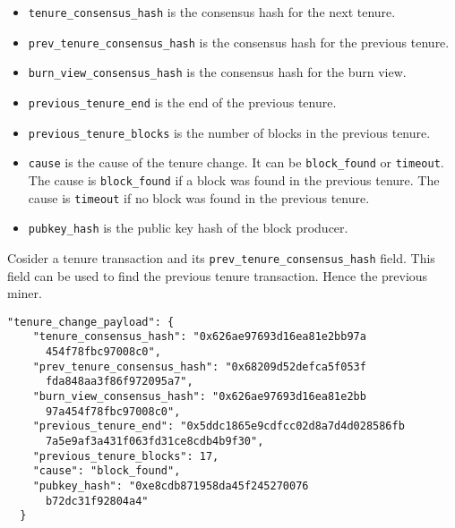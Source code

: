 \documentclass[12pt]{article}
\begin{document}
\begin{itemize}   

\item \lstinline|tenure_consensus_hash| is the consensus hash for the next tenure.

\item \lstinline|prev_tenure_consensus_hash| is the consensus hash for the previous tenure.

\item \lstinline|burn_view_consensus_hash| is the consensus hash for the burn view.

\item \lstinline|previous_tenure_end| is the end of the previous tenure.  

\item \lstinline|previous_tenure_blocks| is the number of blocks in the previous tenure.

\item \lstinline|cause| is the cause of the tenure change.  It can be \lstinline|block_found| or \lstinline|timeout|.
The cause is \lstinline|block_found| if a block was found in the previous tenure.
The cause is \lstinline|timeout| if no block was found in the previous tenure.

\item \lstinline|pubkey_hash| is the public key hash of the block producer.

\end{itemize}
%

Cosider a tenure transaction and its \lstinline|prev_tenure_consensus_hash| field.
This field can be used to find the previous tenure transaction. 
Hence the previous miner. 

%
%
\vspace{0.25in}
%
%

%
%
\begin{lstlisting}[label=JsonTenure,style=json, caption={Tenure part}]
  "tenure_change_payload": {
    "tenure_consensus_hash": "0x626ae97693d16ea81e2bb97a
      454f78fbc97008c0",
    "prev_tenure_consensus_hash": "0x68209d52defca5f053f
      fda848aa3f86f972095a7",
    "burn_view_consensus_hash": "0x626ae97693d16ea81e2bb
      97a454f78fbc97008c0",
    "previous_tenure_end": "0x5ddc1865e9cdfcc02d8a7d4d028586fb
      7a5e9af3a431f063fd31ce8cdb4b9f30",
    "previous_tenure_blocks": 17,
    "cause": "block_found",
    "pubkey_hash": "0xe8cdb871958da45f245270076
      b72dc31f92804a4"
  }
\end{lstlisting}
\end{document}
